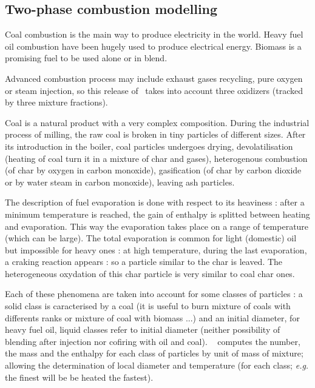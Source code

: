 \subsection{Two-phase combustion modelling}

Coal combustion is the main way to produce electricity in the world. Heavy fuel
oil combustion have been hugely used to produce electrical energy.
Biomass is a promising fuel to be used alone or in blend.

Advanced combustion process may include exhaust gases recycling, pure oxygen or
steam injection, so this release of \CS ~takes into account
three oxidizers (tracked by three mixture fractions).

Coal is a natural product with a very complex composition. During the industrial
process of milling, the raw coal is broken in tiny particles of different
sizes. After its introduction in the boiler, coal particles undergoes drying,
devolatilisation (heating of coal turn it in a mixture of char and gases),
heterogenous combustion (of char by oxygen in carbon monoxide), gasification (of
char by carbon
dioxide or by water steam in carbon monoxide), leaving ash particles.

The description of fuel evaporation is done with respect to its heaviness :
after a minimum temperature is reached, the gain of enthalpy is splitted between
heating and evaporation. This way the evaporation takes place on a range of
temperature (which can be large). The total evaporation is common for light
(domestic) oil but impossible for heavy ones : at high temperature, during the
last evaporation, a craking reaction appears : so a particle similar to the char
is leaved. The heterogeneous oxydation of this char particle is very similar to
coal char ones.

Each of these phenomena are taken into account for some classes of particles : a
solid class is caracterised by a coal (it is useful to burn mixture of coals
with differents ranks or mixture of coal with biomass ...) and an initial
diameter, for heavy fuel oil, liquid classes refer to initial diameter (neither
possibility of blending after injection nor cofiring with oil and coal). \CS~
computes the number, the mass and the enthalpy for each class of particles by
unit of mass of mixture; allowing the determination of local diameter and
temperature (for each class;
\emph{e.g.} the finest will be be heated the fastest).

